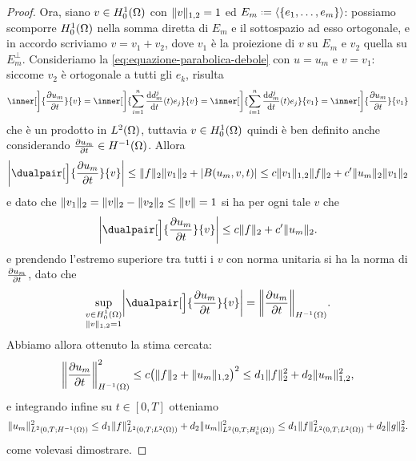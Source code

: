 \begin{proof}
    Ora, siano $v\in\sobHc[1]{\Omega}$ con $\norm{v}_{1,2}=1$ ed $E_m\defeq\gen{\{e_1,\dotsc,e_m\}}$: possiamo scomporre $\sobHc[1]{\Omega}$ nella somma diretta di $E_m$ e il sottospazio ad esso ortogonale, e in accordo scriviamo $v=v_1+v_2$, dove $v_1$ è la proiezione di $v$ su $E_m$ e $v_2$ quella su $E_m^\perp$.
    Consideriamo la \eqref{eq:equazione-parabolica-debole} con $u=u_m$ e $v=v_1$: siccome $v_2$ è ortogonale a tutti gli $e_k$, risulta
    \begin{equation}
        \inner[\bigg]{\drp{u_m}{t}}{v}=
        \inner[\bigg]{\sum_{i=1}^n\drv{d^j_m}{t}(t)e_j}{v}=
        \inner[\bigg]{\sum_{i=1}^n\drv{d^j_m}{t}(t)e_j}{v_1}=
        \inner[\bigg]{\drp{u_m}{t}}{v_1}
    \end{equation}
    che è un prodotto in $\leb[2]{\Omega}$, tuttavia $v\in\sobHc[1]{\Omega}$ quindi è ben definito anche considerando $\drp{u_m}{t}\in\sobH[-1]{\Omega}$.
    Allora
    \begin{equation}
        \abs[\bigg]{\dualpair[\Big]{\drp{u_m}{t}}{v}}\le
        \norm{f}_2\norm{v_1}_2+\abs{B(u_m,v,t)}\le
        c\norm{v_1}_{1,2}\norm{f}_2+c'\norm{u_m}_2\norm{v_1}_2
    \end{equation}
    e dato che $\norm{v_1}_2=\norm{v}_2-\norm{v_2}_2\le\norm{v}=1$ si ha per ogni tale $v$ che
    \begin{equation}
        \abs[\bigg]{\dualpair[\Big]{\drp{u_m}{t}}{v}}\le
        c\norm{f}_2+c'\norm{u_m}_2.
    \end{equation}
    e prendendo l'estremo superiore tra tutti i $v$ con norma unitaria si ha la norma di $\drp{u_m}{t}$, dato che
    \begin{equation}
        \sup_{\substack{v\in\sobHc[1]{\Omega}\\\norm{v}_{1,2}=1}}\abs[\bigg]{\dualpair[\Big]{\drp{u_m}{t}}{v}}=\norm[\bigg]{\drp{u_m}{t}}_{\sobH[-1]{\Omega}}.
    \end{equation}
    Abbiamo allora ottenuto la stima cercata:
    \begin{equation}
        \norm[\bigg]{\drp{u_m}{t}}_{\sobH[-1]{\Omega}}^2\le
        c\bigl(\norm{f}_2+\norm{u_m}_{1,2}\bigr)^2\le
        d_1\norm{f}_2^2+d_2\norm{u_m}_{1,2}^2,
    \end{equation}
    e integrando infine su $t\in[0,T]$ otteniamo
    \begin{equation}
        \norm{u_m}_{\leb[2]{0,T;\sobH[-1]{\Omega}}}^2\le
        d_1\norm{f}_{\leb[2]{0,T;\leb[2]{\Omega}}}^2+d_2\norm{u_m}_{\leb[2]{0,T;\sobHc[1]{\Omega}}}^2\le
        d_1\norm{f}_{\leb[2]{0,T;\leb[2]{\Omega}}}^2+d_2\norm{g}_2^2.
    \end{equation}
    come volevasi dimostrare.
\end{proof}

